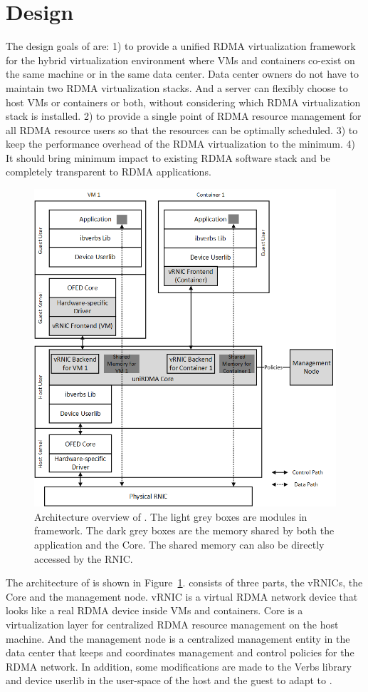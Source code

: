 \section{Design} \label{design}

The design goals of \sys are:
1) to provide a unified RDMA virtualization framework for the hybrid virtualization environment where VMs and containers co-exist on the same machine or in the same data center. Data center owners do not have to maintain two RDMA virtualization stacks. And a server can flexibly choose to host VMs or containers or both, without considering which RDMA virtualization stack is installed.
2) to provide a single point of RDMA resource management for all RDMA resource users so that the resources can be optimally scheduled.
3) to keep the performance overhead of the RDMA virtualization to the minimum.
4) It should bring minimum impact to existing RDMA software stack and be completely transparent to RDMA applications.

\begin{figure}[!ht]
	\centering
	\includegraphics[width=0.8\linewidth]{images/framework-overview.png}
	\caption{Architecture overview of \sys. The light grey boxes are modules in \sys framework. The dark grey boxes are the memory shared by both the application and the \sys Core. The shared memory can also be directly accessed by the RNIC.}
	\label{fig:framework-overview}
\end{figure}

The architecture of \sys is shown in Figure~\ref{fig:framework-overview}.
\sys consists of three parts, the vRNICs, the \sys Core and the management node. vRNIC is a virtual RDMA network device that looks like a real RDMA device inside VMs and containers. \sys Core is a virtualization layer for centralized RDMA resource management on the host machine. And the management node is a centralized management entity in the data center that keeps and coordinates management and control policies for the RDMA network.
In addition, some modifications are made to the Verbs library and device userlib in the user-space of the host and the guest to adapt to \sys.


